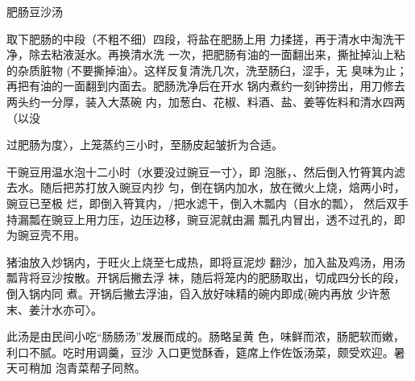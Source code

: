 \begin{recipe}{肥肠豆沙汤}

\ingredients




\cooking

\step 取下肥肠的中段（不粗不细）四段，将盐在肥肠上用 力揉搓，再于清水中淘洗干净，除去粘液涎水。再换清水洗 一次，把肥肠有油的一面翻出来，撕扯掉汕上粘的杂质脏物 (不要撕掉油〉。这样反复清洗几次，洗至肠臼，涩手，无 臭味为止；再把有油的一面翻到内面去。肥肠洗净后在开水 锅内煮约一刻钟捞出，用刀修去两头约一分厚，装入大蒸碗 内，加葱白、花椒、料酒、盐、姜等佐料和清水四两（以没

过肥肠为度〉，上笼蒸约三小时，至肠皮起皱折为合适。

\step 干豌豆用温水泡十二小时（水要没过豌豆一寸〉，即 泡胀，、然后倒入竹筲箕内滤去水。随后把苏打放入豌豆内抄 匀，倒在锅内加水，放在微火上烧，焙两小时，豌豆已至极 烂，即倒入筲箕内，/把水滤干，倒入木瓢内（目水的瓢〉， 然后双手持漏瓢在豌豆上用力压，边压边移，豌豆泥就由漏 瓢孔内冒出，透不过孔的，即为豌豆壳不用。

\step 猪油放入炒锅内，于旺火上烧至七成热，即将亘泥炒 翻沙，加入盐及鸡汤，用汤瓢背将豆沙按散。开锅后撇去浮 袜，随后将笼内的肥肠取出，切成四分长的段，倒入锅内同 煮。开锅后撇去浮油，舀入放好味精的碗内即成(碗内再放 少许葱末、姜汁水亦可〉。

\notes

此汤是由民间小吃“肠肠汤”发展而成的。肠略呈黄 色，味鲜而浓，肠肥软而嫩，利口不腻。吃时用调羹，豆沙 入口更觉酥香，筵席上作佐饭汤菜，颇受欢迎。暑天可稍加 泡青菜帮子同熬。

\end{recipe}

